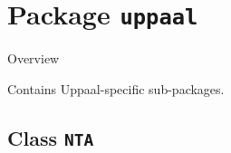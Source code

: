 
		
		\section{Package \bfseries \texttt{uppaal}\normalfont}
		
		\begin{longdescription}
		\item[Overview]			
				

	

		Contains Uppaal-specific sub-packages.		
		\end{longdescription}
	

\subsection{Class \bfseries \texttt{NTA}\normalfont}
\label{cls:uppaal::NTA} 
	
